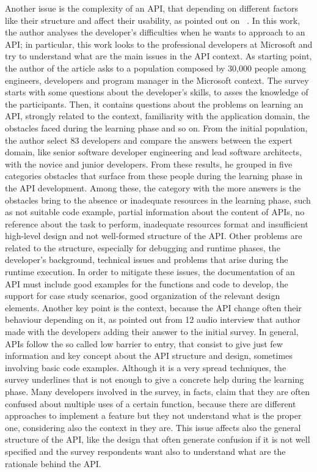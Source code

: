 Another issue is the complexity of an API, that depending on different factors like their structure and affect their usability, as pointed out on ~\cite{martin_p._robillard_what_2009}. In this work, the author analyses the developer's difficulties when he wants to approach to an API; in particular, this work looks to the professional developers at Microsoft and try to understand what are the main issues in the API context. As starting point, the author of the article asks to a population composed by 30,000 people among engineers, developers and program manager in the Microsoft context. The survey starts with some questions about the developer's skills, to asses the knowledge of the participants. Then, it contains questions about the problems on learning an API, strongly related to the context, familiarity with the application domain, the obstacles faced during the learning phase and so on. From the initial population, the author select 83 developers and compare the answers between the expert domain, like senior software developer engineering and lead software architects, with the novice and junior developers. From these results, he grouped in five categories obstacles that surface from these people during the learning phase in the API development. Among these, the category with the more answers is the obstacles bring to the absence or inadequate resources in the learning phase, such as not suitable code example, partial information about the content of APIs, no reference about the task to perform, inadequate resources format and insufficient high-level design and not well-formed structure of the API. Other problems are related to the structure, especially for debugging and runtime phases, the developer's background, technical issues and problems that arise during the runtime execution. In order to mitigate these issues, the documentation of an API must include good examples for the functions and code to develop, the support for case study scenarios, good organization of the relevant design elements. Another key point is the context, because the API change often their behaviour depending on it, as pointed out from 12 audio interview that author made with the developers adding their answer to the initial survey. In general, APIs follow the so called low barrier to entry, that consist to give just few information and key concept about the API structure and design, sometimes involving basic code examples. Although it is a very spread techniques, the survey underlines that is not enough to give a concrete help during the learning phase. Many developers involved in the survey, in facts, claim that they are often confused about multiple uses of a certain function, because there are different approaches to implement a feature but they not understand what is the proper one, considering also the context in they are. This issue affects also the general structure of the API, like the design that often generate confusion if it is not well specified and the survey respondents want also to understand what are the rationale behind the API.  \newline
